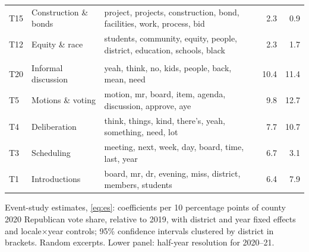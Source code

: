 \begin{table}[H]
\begin{tabularx}{\linewidth}{@{}l l X r r@{}}
T15 & Construction \& bonds      & project, projects, construction, bond, facilities, work, process, bid & 2.3 & 0.9 \\
T12 & Equity \& race             & students, community, equity, people, district, education, schools, black & 2.3 & 1.7 \\
\addlinespace
\multicolumn{5}{@{}l}{\textit{Panel B: Procedural and conversational topics}} \\
T20 & Informal discussion        & yeah, think, no, kids, people, back, mean, need & 10.4 & 11.4 \\
T5  & Motions \& voting          & motion, mr, board, item, agenda, discussion, approve, aye & 9.8 & 12.7 \\
T4  & Deliberation               & think, things, kind, there's, yeah, something, need, lot & 7.7 & 10.7 \\
T3  & Scheduling                 & meeting, next, week, day, board, time, last, year & 6.7 & 3.1 \\
T1  & Introductions              & board, mr, dr, evening, miss, district, members, students & 6.4 & 7.9 \\
\bottomrule
\end{tabularx}
\end{table}


\begin{table}[H]
\centering
\caption{Event-study estimates, \cref{eq:es}: coefficients per 10 percentage points of county 2020 Republican vote share, relative to 2019, with district and year fixed effects and locale$\times$year controls; 95\% confidence intervals clustered by district in brackets. Random excerpts. Lower panel: half-year resolution for 2020--21.}
\label{tab:llm-es}
\footnotesize
\setlength{\tabcolsep}{4pt}
\resizebox{\textwidth}{!}{}
\end{table}

